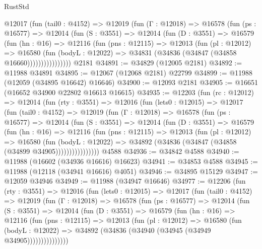 \begin{lexlean}{RustStd}
\begin{coremodule}
          @12017
            (fun (tail0 : @4152) =>
            @12019
              (fun (Γ : @12018) =>
              @16578
                (fun (ps : @16577) =>
                @12014
                  (fun (S : @3551) =>
                  @12014
                    (fun (D : @3551) =>
                    @16579
                      (fun (hn : @16) =>
                      @12116
                        (fun (pns : @12115) =>
                        @12013
                          (fun (pl : @12012) =>
                          @16580
                            (fun (bodyL : @12022) =>
                            @34831 (@34836 (@34847 (@34858 @16660))))))))))))))))
    @2181
@34891 := @34829 (@12005 @2181)
@34892 := @11988 @34891
@34895 := @12067 (@12068 @2181) @22799
@34899 := @11988 (@12059 (@34895 @16642) @16646)
@34900 := @12093 @2181
@34905 := @16651 (@16652 @34900 @22802 @16613 @16615)
@34935 := @12203
    (fun (rc : @12012) =>
    @12014
      (fun (rty : @3551) =>
      @12016
        (fun (lets0 : @12015) =>
        @12017
          (fun (tail0 : @4152) =>
          @12019
            (fun (Γ : @12018) =>
            @16578
              (fun (ps : @16577) =>
              @12014
                (fun (S : @3551) =>
                @12014
                  (fun (D : @3551) =>
                  @16579
                    (fun (hn : @16) =>
                    @12116
                      (fun (pns : @12115) =>
                      @12013
                        (fun (pl : @12012) =>
                        @16580
                          (fun (bodyL : @12022) =>
                          @34892 (@34836 (@34847 (@34858 (@34899 @34905))))))))))))))))
    @4588
@34936 := @34842 @4588
@34940 := @11988 (@16602 (@34936 @16616) @16623)
@34941 := @34853 @4588
@34945 := @11988 (@12118 (@34941 @16616) @4051)
@34946 := @34895 @15129
@34947 := @12059 @34946
@34949 := @11988 (@34947 @16646)
@34977 := @12206
    (fun (rty : @3551) =>
    @12016
      (fun (lets0 : @12015) =>
      @12017
        (fun (tail0 : @4152) =>
        @12019
          (fun (Γ : @12018) =>
          @16578
            (fun (ps : @16577) =>
            @12014
              (fun (S : @3551) =>
              @12014
                (fun (D : @3551) =>
                @16579
                  (fun (hn : @16) =>
                  @12116
                    (fun (pns : @12115) =>
                    @12013
                      (fun (pl : @12012) =>
                      @16580
                        (fun (bodyL : @12022) =>
                        @34892 (@34836 (@34940 (@34945 (@34949 @34905)))))))))))))))

\end{coremodule}
\end{lexlean}
